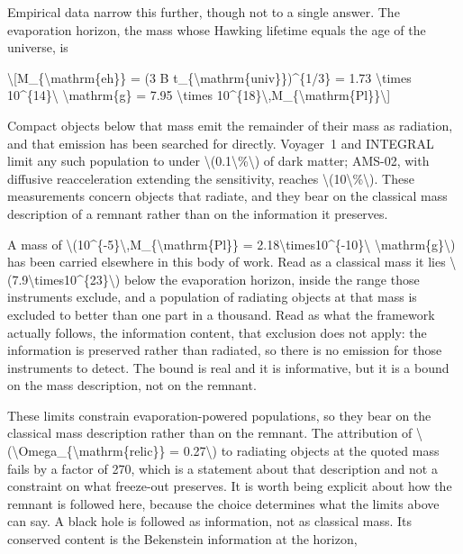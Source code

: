 \documentclass[
  10pt,
]{article}
\begin{document}
Empirical data narrow this further, though not to a single answer. The
evaporation horizon, the mass whose Hawking lifetime equals the age of
the universe, is

\textbackslash{[}M\_\{\textbackslash mathrm\{eh\}\} = (3 B
t\_\{\textbackslash mathrm\{univ\}\})\^{}\{1/3\} = 1.73
\textbackslash times 10\^{}\{14\}\textbackslash{}
\textbackslash mathrm\{g\} = 7.95 \textbackslash times
10\^{}\{18\}\textbackslash,M\_\{\textbackslash mathrm\{Pl\}\}\textbackslash{]}

Compact objects below that mass emit the remainder of their mass as
radiation, and that emission has been searched for directly. Voyager~1
and INTEGRAL limit any such population to under
\textbackslash(0.1\textbackslash\%\textbackslash) of dark matter;
AMS-02, with diffusive reacceleration extending the sensitivity, reaches
\textbackslash(10\textbackslash\%\textbackslash). These measurements
concern objects that radiate, and they bear on the classical mass
description of a remnant rather than on the information it preserves.

A mass of
\textbackslash(10\^{}\{-5\}\textbackslash,M\_\{\textbackslash mathrm\{Pl\}\}
= 2.18\textbackslash times10\^{}\{-10\}\textbackslash{}
\textbackslash mathrm\{g\}\textbackslash) has been carried elsewhere in
this body of work. Read as a classical mass it lies
\textbackslash(7.9\textbackslash times10\^{}\{23\}\textbackslash) below
the evaporation horizon, inside the range those instruments exclude, and
a population of radiating objects at that mass is excluded to better
than one part in a thousand. Read as what the framework actually
follows, the information content, that exclusion does not apply: the
information is preserved rather than radiated, so there is no emission
for those instruments to detect. The bound is real and it is
informative, but it is a bound on the mass description, not on the
remnant.

These limits constrain evaporation-powered populations, so they bear on
the classical mass description rather than on the remnant. The
attribution of
\textbackslash(\textbackslash Omega\_\{\textbackslash mathrm\{relic\}\}
= 0.27\textbackslash) to radiating objects at the quoted mass fails by a
factor of 270, which is a statement about that description and not a
constraint on what freeze-out preserves. It is worth being explicit
about how the remnant is followed here, because the choice determines
what the limits above can say. A black hole is followed as information,
not as classical mass. Its conserved content is the Bekenstein
information at the horizon,
\end{document}
